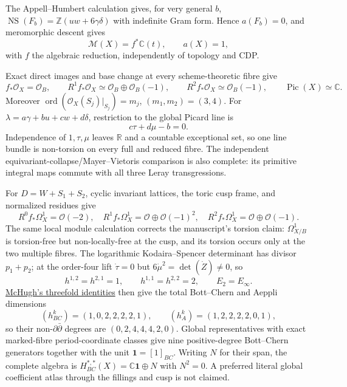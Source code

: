 {\ResultSmall
The Appell--Humbert calculation gives, for very general \(b\),
\(\operatorname{NS}(F_b)=\mathbb Z(uw+6\gamma\delta)\) with indefinite Gram
form.  Hence \(a(F_b)=0\), and meromorphic descent gives
\[
 \mathcal M(X)=f^*\mathbb C(t),\qquad a(X)=1,
\]
with \(f\) the algebraic reduction, independently of topology and CDP.
}

{\ResultSmall
Exact direct images and base change at every scheme-theoretic fibre give
\[
 f_*\mathcal O_X=\mathcal O_B,\qquad
 R^1f_*\mathcal O_X\simeq\mathcal O_B\oplus\mathcal O_B(-1),\qquad
 R^2f_*\mathcal O_X\simeq\mathcal O_B(-1),\qquad
 \operatorname{Pic}(X)\simeq\mathbb C.
\]
Moreover \(\operatorname{ord}(\mathcal O_X(S_j)|_{S_j})=m_j\),
\((m_1,m_2)=(3,4)\).  For
\(\lambda=a\gamma+bu+cw+d\delta\), restriction to the global Picard line is
\[
 c\tau+d\mu-b=0.
\]
Independence of \(1,\tau,\mu\) leaves \(\mathbb R\) and a countable exceptional
set, so one line bundle is non-torsion on every full and reduced fibre.  The
independent equivariant-collapse/Mayer--Vietoris comparison is also complete:
its primitive integral maps commute with all three Leray transgressions.
}

{\ResultSmall
For \(D=W+S_1+S_2\), cyclic invariant lattices, the toric cusp frame, and
normalized residues give
\[
R^0f_*\Omega_X^1=\mathcal O(-2),\quad
R^1f_*\Omega_X^1=\mathcal O\oplus\mathcal O(-1)^2,\quad
R^2f_*\Omega_X^1=\mathcal O\oplus\mathcal O(-1).
\]
The same local module calculation corrects the manuscript's torsion claim:
$\Omega^1_{X/B}$ is torsion-free but non-locally-free at the cusp, and its
torsion occurs only at the two multiple fibres.
The logarithmic Kodaira--Spencer determinant has divisor \(p_1+p_2\); at the
order-four lift \(\dot\tau=0\) but
\(6\dot\mu^2=\det(\dot Z)\ne0\), so
\[
h^{1,2}=h^{2,1}=1,\qquad h^{1,1}=h^{2,2}=2,\qquad E_2=E_\infty.
\]
\href{https://www.rivmat.unipr.it/vols/2019-10-1/02-mchugh.html}%
{McHugh's threefold identities} then give the total Bott--Chern and Aeppli
dimensions
\[
(h^k_{BC})=(1,0,2,2,2,2,1),\qquad
(h^k_A)=(1,2,2,2,2,0,1),
\]
so their non-$\partial\bar\partial$ degrees are
$(0,2,4,4,4,2,0)$.  Global representatives with exact marked-fibre
period-coordinate classes give nine positive-degree Bott--Chern generators
together with the unit \(\mathbf1=[1]_{BC}\).
Writing $N$ for their span, the complete algebra is
$H^{*,*}_{BC}(X)=\mathbb C\mathbf1\oplus N$ with $N^2=0$.  A preferred
literal global coefficient atlas through the fillings and cusp is not claimed.
}

